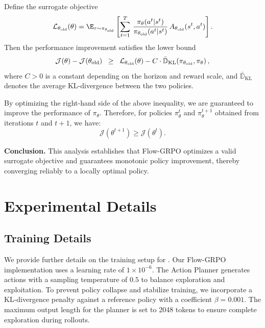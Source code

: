 \begin{theorem}
Define the surrogate objective
\begin{equation}
\mathcal{L}_{\theta_{\rm old}}(\theta) 
= \E_{\tau \sim \pi_{\theta_{\rm old}}} \left[ \sum_{t=1}^{T} \, 
\frac{\pi_{\theta}(a^t|s^t)}{\pi_{\theta_{\rm old}}(a^t|s^t)} \, A_{\theta_{\rm old}}(s^t, a^t) \right].
\end{equation}
Then the performance improvement satisfies the lower bound
\begin{equation}
\mathcal{J}(\theta) - \mathcal{J}(\theta_{\rm old}) 
\;\;\ge\;\; \mathcal{L}_{\theta_{\rm old}}(\theta) 
- C \cdot \bar{\mathbb{D}}_{\mathrm{KL}}\!\left(\pi_{\theta_{\rm old}}, \pi_{\theta}\right),
\end{equation}
where $C > 0$ is a constant depending on the horizon and reward scale, and 
$\bar{\mathbb{D}}_{\mathrm{KL}}$ denotes the average KL-divergence between the two policies.
\end{theorem}

By optimizing the right-hand side of the above inequality, we are guaranteed to improve the performance of $\pi_\theta$. Therefore, for policies $\pi_\theta^t$ and $\pi_\theta^{t+1}$ obtained from iterations $t$ and $t+1$, we have:
\begin{equation}
\mathcal{J}(\theta^{t+1}) \geq \mathcal{J}(\theta^t).
\end{equation}













\textbf{Conclusion.}
This analysis establishes that Flow-GRPO optimizes a valid surrogate objective and guarantees monotonic policy improvement, thereby converging reliably to a locally optimal policy.



\clearpage
\section{Experimental Details}
\label{app:exp_details}

\subsection{Training Details}
\label{app:training_details}


We provide further details on the training setup for \model. Our Flow-GRPO implementation uses a learning rate of $1 \times 10^{-6}$. The Action Planner generates actions with a sampling temperature of $0.5$ to balance exploration and exploitation. To prevent policy collapse and stabilize training, we incorporate a KL-divergence penalty against a reference policy with a coefficient $\beta = 0.001$. The maximum output length for the planner is set to 2048 tokens to ensure complete exploration during rollouts.

